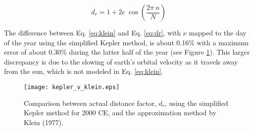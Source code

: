 \begin{equation}
\label{eq:klein}
    d_r = 1 + 2 e \: \cos \left( \frac{2 \pi \: n}{N} \right)
\end{equation}

The difference between Eq. \ref{eq:klein} and Eq. \ref{eq:dr}, with $\nu$ mapped to the day of the year using the simplified Kepler method, is about 0.16\% with a maximum error of about 0.30\% during the latter half of the year (see Figure \ref{fig:klein}). 
This larger discrepancy is due to the slowing of earth's orbital velocity as it travels away from the sun, which is not modeled in Eq. \ref{eq:klein}.\\

\begin{figure}[ht!]
    \texttt{[image: kepler\_v\_klein.eps]}
    \caption{Comparison between actual distance factor, $d_r$, using the simplified Kepler method for 2000 CE, and the approximation method by Klein (1977).}
    \label{fig:klein}
\end{figure}

